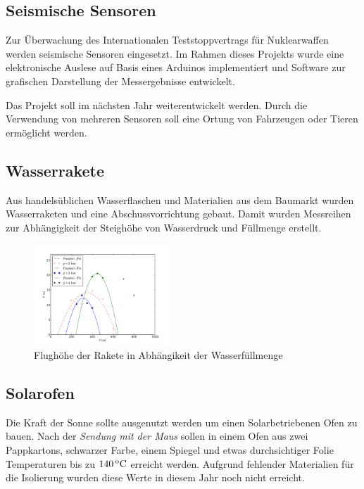 \documentclass[pdftex, twocolumn=true, parskip=half]{scrartcl}
\begin{document}
\subsection{Seismische Sensoren}
Zur Überwachung des Internationalen Teststoppvertrags für Nuklearwaffen werden seismische Sensoren eingesetzt. Im Rahmen dieses Projekts wurde eine elektronische Auslese auf Basis eines Arduinos implementiert und Software zur grafischen Darstellung der Messergebnisse entwickelt.

Das Projekt soll im nächsten Jahr weiterentwickelt werden. Durch die Verwendung von mehreren Sensoren soll eine Ortung von Fahrzeugen oder Tieren ermöglicht werden.
\subsection{Wasserrakete}
Aus handelsüblichen Wasserflaschen und Materialien aus dem Baumarkt wurden Wasserraketen und eine Abschussvorrichtung gebaut. Damit wurden Messreihen zur Abhängigkeit der Steighöhe von Wasserdruck und Füllmenge erstellt.
\begin{figure}[!h]
\centering
\includegraphics[width=0.45\textwidth]{figs/rakete/raketenplot.pdf}
\caption{Flughöhe der Rakete in Abhängikeit der Wasserfüllmenge}
\end{figure}
\subsection{Solarofen}
Die Kraft der Sonne sollte ausgenutzt werden um einen Solarbetriebenen Ofen zu bauen. Nach der \textit{Sendung mit der Maus} sollen in einem Ofen aus zwei Pappkartons, schwarzer Farbe, einem Spiegel und etwas durchsichtiger Folie Temperaturen bis zu $\unit[140]{^oC}$ erreicht werden. Aufgrund fehlender Materialien für die Isolierung wurden diese Werte in diesem Jahr noch nicht erreicht.
\end{document}
